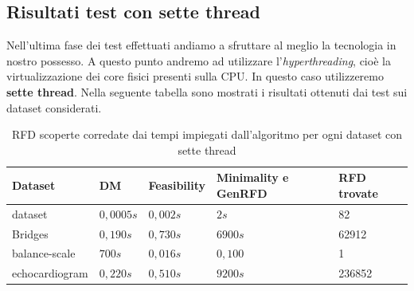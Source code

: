 \subsection{Risultati test con sette thread}
Nell'ultima fase dei test effettuati andiamo a sfruttare al meglio la tecnologia in nostro possesso.
A questo punto andremo ad utilizzare l'\emph{hyperthreading}, cioè la virtualizzazione dei core fisici presenti sulla CPU. In questo caso utilizzeremo \textbf{sette thread}.
Nella seguente tabella sono mostrati i risultati ottenuti dai test sui dataset considerati.
\begin{table}[H]
	\centering
	\begin{tabular}{lllll}
		Dataset & DM & Feasibility & Minimality e GenRFD & RFD trovate \\
		\hline
		dataset& $0,0005s$ & $0,002s$& $2s$  & 82 \\
		Bridges & $0,190s$  & $0,730s$ & $6900s$ & 62912 \\
		balance-scale  & $700s$  & $0,016s$ & $0,100$ & 1\\
		echocardiogram  & $0,220s$  & $0,510s$ & $9200s$ & 236852\\
		\hline
	\end{tabular}
	\label{risultati_7_thread}
	\caption{RFD scoperte corredate dai tempi impiegati dall'algoritmo per ogni dataset con sette thread}
\end{table}
